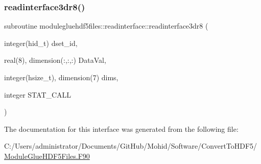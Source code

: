 \subsubsection{\texorpdfstring{readinterface3dr8()}{readinterface3dr8()}}
{\footnotesize\ttfamily subroutine modulegluehdf5files\+::readinterface\+::readinterface3dr8 (\begin{DoxyParamCaption}\item[{integer(hid\+\_\+t)}]{dset\+\_\+id,  }\item[{real(8), dimension(\+:,\+:,\+:)}]{Data\+Val,  }\item[{integer(hsize\+\_\+t), dimension(7)}]{dims,  }\item[{integer}]{S\+T\+A\+T\+\_\+\+C\+A\+LL }\end{DoxyParamCaption})\hspace{0.3cm}{\ttfamily [private]}}



The documentation for this interface was generated from the following file\+:\begin{DoxyCompactItemize}
\item 
C\+:/\+Users/administrator/\+Documents/\+Git\+Hub/\+Mohid/\+Software/\+Convert\+To\+H\+D\+F5/\mbox{\hyperlink{_module_glue_h_d_f5_files_8_f90}{Module\+Glue\+H\+D\+F5\+Files.\+F90}}\end{DoxyCompactItemize}
